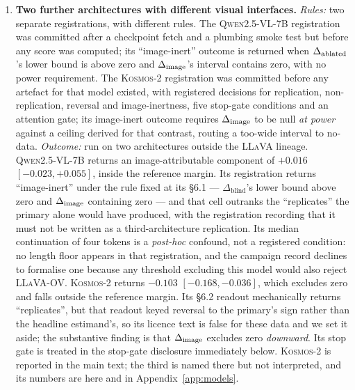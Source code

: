 \begin{enumerate}
\item \textbf{Two further architectures with different visual interfaces.}
\emph{Rules:} two separate registrations, with different rules. The \textsc{Qwen2.5-VL-7B}
registration was committed after a checkpoint fetch and a plumbing smoke test but before any score was
computed; its ``image-inert'' outcome is returned when $\Delta_{\mathrm{ablated}}$'s lower bound is above zero and
$\Delta_{\mathrm{image}}$'s interval contains zero, with no power requirement. The \textsc{Kosmos-2} registration was
committed before any artefact for that model existed, with registered decisions for replication,
non-replication, reversal and image-inertness, five stop-gate conditions and an attention gate; its
image-inert outcome requires $\Delta_{\mathrm{image}}$ to be null \emph{at power} against a ceiling derived for that
contrast, routing a too-wide interval to no-data.
\emph{Outcome:} run on two architectures outside the \textsc{LLaVA} lineage.
\textsc{Qwen2.5-VL-7B} returns an image-attributable component of $+0.016$ $[-0.023, +0.055]$, inside
the reference margin. Its registration returns ``image-inert'' under the rule fixed at its \S6.1 ---
$\Delta_{\text{blind}}$'s lower bound above zero and $\Delta_{\mathrm{image}}$ containing zero --- and
that cell outranks the ``replicates'' the primary alone would have produced, with the registration
recording that it must not be written as a third-architecture replication. Its median continuation of
four tokens is a \emph{post-hoc} confound, not a registered condition: no length floor appears in
that registration, and the campaign record declines to formalise one because any threshold excluding
this model would also reject \textsc{LLaVA-OV}. \textsc{Kosmos-2} returns $-0.103$
$[-0.168, -0.036]$, which excludes zero and falls outside the reference margin. Its \S6.2 readout
mechanically returns ``replicates'', but that readout keyed reversal to the primary's sign rather
than the headline estimand's, so its licence text is false for these data and we set it aside;
the substantive finding is that $\Delta_{\mathrm{image}}$ excludes zero \emph{downward}. Its stop gate is treated in the
stop-gate disclosure immediately below. \textsc{Kosmos-2} is reported in the main text; the third is
named there but not interpreted, and its numbers are here and in Appendix~\ref{app:models}.


\end{enumerate}

